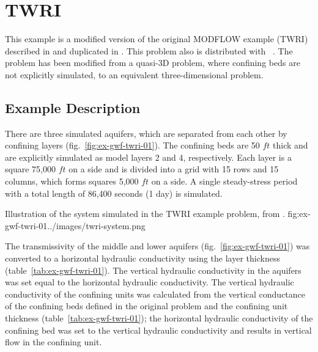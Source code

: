 \section{TWRI}

This example is a modified version of the original MODFLOW example (TWRI) described in \cite{modflow88} and duplicated in \cite{harbaugh1996user}. This problem also is distributed with \mff~\citep{modflow2005}. The problem has been modified from a quasi-3D problem, where confining beds are not explicitly simulated, to an equivalent three-dimensional problem.

\subsection{Example Description}
There are three simulated aquifers, which are separated from each other by confining layers (fig.~\ref{fig:ex-gwf-twri-01}). The confining beds are 50 $ft$ thick and are explicitly simulated as model layers 2 and 4, respectively. Each layer is a square 75,000 $ft$ on a side and is divided into a grid with 15 rows and 15 columns, which forms squares 5,000 $ft$ on a side. A single steady-stress period with a total length of 86,400 seconds (1 day) is simulated.

\begin{StandardFigure}{
                                     Illustration of the system simulated in the TWRI example problem, from \cite{modflow88}.
                                     }{fig:ex-gwf-twri-01}{../images/twri-system.png}
\end{StandardFigure}                                 

The transmissivity of the middle and lower aquifers (fig.~\ref{fig:ex-gwf-twri-01}) was converted to a horizontal hydraulic conductivity using the layer thickness (table~\ref{tab:ex-gwf-twri-01}). The vertical hydraulic conductivity in the aquifers was set equal to the horizontal hydraulic conductivity. The vertical hydraulic conductivity of the confining units was calculated from the vertical conductance of the confining beds defined in the original problem and the confining unit thickness (table~\ref{tab:ex-gwf-twri-01}); the horizontal hydraulic conductivity of the confining bed was set to the vertical hydraulic conductivity and results in vertical flow in the confining unit.




